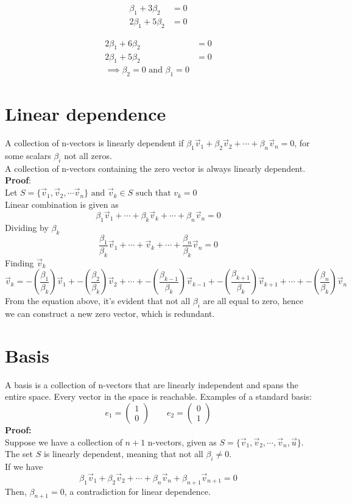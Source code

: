 \documentclass[11pt]{article}
\begin{document}
\begin{align}
 \beta_1 + 3 \beta_2 & = 0\\
 2 \beta_1 + 5 \beta_2 &= 0
\end{align}

\begin{align*}
2 \beta_1 + 6 \beta_2 & = 0\\
 2 \beta_1 + 5 \beta_2 &= 0\\
 \implies \beta_2 = 0 \text{ and } \beta_1 = 0 
\end{align*}
\section{Linear dependence}
A collection of n-vectors is linearly dependent if $\beta_1 \vec v_1 + \beta_2 \vec v_2 + \cdots + \beta_n \vec v_n = 0$, for some scalars $\beta_i$ not all zeros.\\[0.1in]
A collection of n-vectors containing the zero vector is always linearly dependent.\\[0.1in]
\textbf{Proof}:\\[0.1in]
Let $
S = \{\vec v_1, \vec v_2, \cdots \vec v_n\} \text{ and } \vec v_k  \in S \text{ such that } v_k = 0
$\\
Linear combination is given as 
\[\beta_1 \vec v_1 + \cdots + \beta_k \vec v_k + \cdots + \beta_n \vec v_n = 0
\]
Dividing by $\beta_k$
\[\frac{\beta_1}{\beta_k}\vec v_1 + \cdots + \vec v_k + \cdots + \frac{\beta_n}{\beta_k}\vec v_n = 0
\]
Finding $\vec v_k$
\[
\vec v_k =                                      -\left(\frac{\beta_1}{\beta_k}\right)\vec v_ 1 +  -\left(\frac{\beta_2}{\beta_k}\right)\vec v_ 2 +\cdots + -\left(\frac{\beta_{k-1}}{\beta_k}\right)\vec v_ {k -1} +-\left(\frac{\beta_{k + 1}}{\beta_k}\right)\vec v_ {k + 1} +\cdots +
-\left(\frac{\beta_n}{\beta_k}\right)\vec v_ n 
\]
From the equation above, it's evident that not all $\beta_i$ are all equal to zero, hence we can construct a new zero vector, which is redundant.
\section{Basis}
A basis is a collection of n-vectors that are linearly independent and spans the entire space. Every vector in the space is reachable. Examples of a standard basis:
\[e_1 = \begin{pmatrix}
1 \\ 0 
\end{pmatrix} \qquad 
e_2 = 
\begin{pmatrix}
0 \\ 1
\end{pmatrix}
\]
\textbf{Proof:}\\[0.15in]
Suppose we have a collection of $n + 1$ n-vectors, given as 
$
S =
\{ 
\vec v_1, \vec v_2, \cdots , \vec v_n, \vec u \}$. The set  $S$ is linearly dependent, meaning that not all $\beta_i \neq 0$. \\[0.1in]
If we have
\[
\beta_1 \vec v_1 + \beta_2 \vec v_2 + \cdots + \beta_n \vec v_n + \beta_{n+1} \vec v_{n+1} = 0
\]
Then, $\beta_{n +1} = 0$, a contradiction for linear dependence.
\end{document}
